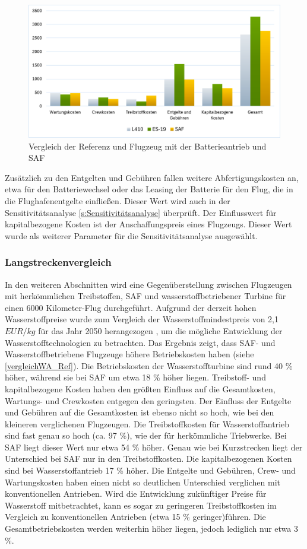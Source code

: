 \begin{figure}[h]
	\centering
	\includegraphics[width=0.9\linewidth]{Bilder/VergleichBA_Ref.png}
	\caption[Betriebskosten]{Vergleich der Referenz und Flugzeug mit der Batterieantrieb und SAF}
	\label{vergleichBA_Ref}
\end{figure}

Zusätzlich zu den Entgelten und Gebühren fallen weitere Abfertigungskosten an,
etwa für den Batteriewechsel oder das Leasing der Batterie für den Flug,
die in die Flughafenentgelte einfließen.
Dieser Wert wird auch in der Sensitivitätsanalyse \ref{s:Sensitivitätsanalyse} überprüft. 
Der Einflusswert für kapitalbezogene Kosten ist der Anschaffungspreis eines Flugzeugs. 
Dieser Wert wurde als weiterer Parameter für die Sensitivitätsanalyse ausgewählt.
%
\subsubsection{Langstreckenvergleich}
In den weiteren Abschnitten wird eine Gegenüberstellung zwischen Flugzeugen mit herkömmlichen Treibstoffen, 
SAF und wasserstoffbetriebener Turbine für einen 6000 Kilometer-Flug durchgeführt. %
Aufgrund der derzeit hohen Wasserstoffpreise wurde zum Vergleich der Wasserstoffmindestpreis 
von 2,1 $EUR/kg$ für das Jahr 2050 herangezogen \cite{hoelzen2022hydrogen}, 
um die mögliche Entwicklung der Wasserstofftechnologien zu betrachten.
%
Das Ergebnis zeigt, dass SAF- und Wasserstoffbetriebene Flugzeuge höhere Betriebskosten haben (siehe \ref{vergleichWA_Ref}).
Die Betriebskosten der Wasserstoffturbine sind rund 40 \% höher, während sie bei SAF um etwa 18 \% höher liegen.
Treibstoff- und kapitalbezogene Kosten haben den größten Einfluss auf die Gesamtkosten, 
Wartungs- und Crewkosten entgegen den geringsten.
Der Einfluss der Entgelte und Gebühren auf die Gesamtkosten ist ebenso nicht so hoch, 
wie bei den kleineren verglichenen Flugzeugen.
Die Treibstoffkosten für Wasserstoffantrieb sind fast genau so hoch (ca. 97 \%), wie der für herkömmliche Triebwerke. 
Bei SAF liegt dieser Wert nur etwa 54 \% höher. 
Genau wie bei Kurzstrecken liegt der Unterschied bei SAF nur in den Treibstoffkosten.
Die kapitalbezogenen Kosten sind bei Wasserstoffantrieb 17 \% höher.
Die Entgelte und Gebühren, Crew- und Wartungskosten haben einen nicht so 
deutlichen Unterschied verglichen mit konventionellen Antrieben. 
%
Wird die Entwicklung zukünftiger Preise für Wasserstoff mitbetrachtet, 
kann es sogar zu geringeren Treibstoffkosten im Vergleich zu konventionellen Antrieben (etwa 15 \% geringer)führen. 
Die Gesamtbetriebskosten werden weiterhin höher liegen, jedoch lediglich nur etwa 3 \%.

